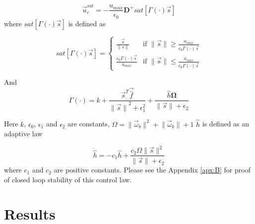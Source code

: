 \begin{equation}
\vec{u}^{sat}_{c} = -\frac{u_{max}}{\epsilon_{0}}\mathbf{D}^+ sat[\Gamma(\cdot)\vec{s}]
\end{equation}
where $sat[\Gamma(\cdot)\vec{s}]$ is defined as

\begin{equation}
    sat[\Gamma(\cdot)\vec{s}]=\begin{cases}
        \frac{\vec{s}}{\lVert s \rVert} & \text{if } \lVert \vec{s} \rVert \geq \frac{u_{max}}{\epsilon_0\Gamma(\cdot)\vec{s}}\\
        \frac{\epsilon_0\Gamma(\cdot)\vec{s}}{u_{max}} & \text{if } \lVert \vec{s} \rVert \leq \frac{u_{max}}{\epsilon_0\Gamma(\cdot)\vec{s}}
    \end{cases}
\end{equation}

And 
\begin{equation}
\Gamma(\cdot)=k+\frac{\vec{s}^T\vec{\hat{f}}}{{\lVert \vec{s} \rVert}^2+\epsilon_{1}^2}+ 
\frac{\hat{h}\mathbf{\Omega}}{\lVert \vec{s} \rVert + \epsilon_{2}}
\end{equation}

Here $k$, $\epsilon_0$, $\epsilon_1$ and $\epsilon_2$ are constants, $\Omega = \lVert\vec{\omega}_b\rVert^2 + \lVert\vec{\omega}_b\rVert + 1$ $\hat{h}$ is defined as an adaptive law

\begin{equation}
    \dot{\hat{h}} = -c_1\hat{h} + \frac{c_2\Omega\lVert\vec{s}\rVert^2}{\lVert\vec{s}\rVert+\epsilon_2}
\end{equation}
where $c_1$ and $c_2$ are positive constants.
Please see the Appendix \ref{apx:B} for proof of closed loop stability of this control law. 


\section{Results}
